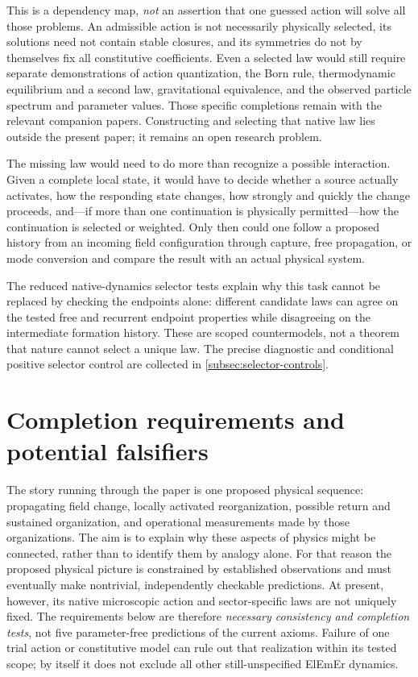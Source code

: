 \documentclass[11pt]{article}
\theoremstyle{definition}
\newcommand{\ElEmEr}{\mbox{ElEmEr}}
\begin{document}
This is a dependency map, \emph{not} an assertion that one guessed action will
solve all those problems.  An admissible action is not necessarily physically
selected, its solutions need not contain stable closures, and its symmetries
do not by themselves fix all constitutive coefficients.  Even a selected law
would still require separate demonstrations of action quantization, the Born
rule, thermodynamic equilibrium and a second law, gravitational equivalence,
and the observed particle spectrum and parameter values.  Those specific
completions remain with the relevant companion papers.  Constructing and selecting that native law lies outside the present paper;
it remains an open research problem.

The missing law would need to do more than recognize a possible interaction.
Given a complete local state, it would have to decide whether a source actually
activates, how the responding state changes, how strongly and quickly the change
proceeds, and---if more than one continuation is physically permitted---how the
continuation is selected or weighted.  Only then could one follow a proposed
history from an incoming field configuration through capture, free propagation,
or mode conversion and compare the result with an actual physical system.

The reduced native-dynamics selector tests explain why this task cannot be replaced
by checking the endpoints alone: different candidate laws can agree on the tested
free and recurrent endpoint properties while disagreeing on the intermediate
formation history.  These are scoped countermodels, not a theorem that nature
cannot select a unique law.  The precise diagnostic and conditional positive
selector control are collected in \cref{subsec:selector-controls}.


\section{Completion requirements and potential falsifiers}
\label{sec:falsifiability}

The story running through the paper is one proposed physical sequence:
propagating field change, locally activated reorganization, possible return
and sustained organization, and operational measurements made by those
organizations.  The aim is to explain why these aspects of physics might be
connected, rather than to identify them by analogy alone.  For that reason
the proposed physical picture is constrained by established observations and
must eventually make nontrivial, independently checkable predictions.  At
present, however, its native microscopic action and sector-specific laws are
not uniquely fixed.  The requirements below are therefore \emph{necessary
consistency and completion tests}, not five parameter-free predictions of the
current axioms.  Failure of one trial action or constitutive model can rule
out that realization within its tested scope; by itself it does not exclude
all other still-unspecified \ElEmEr{} dynamics.
\end{document}
